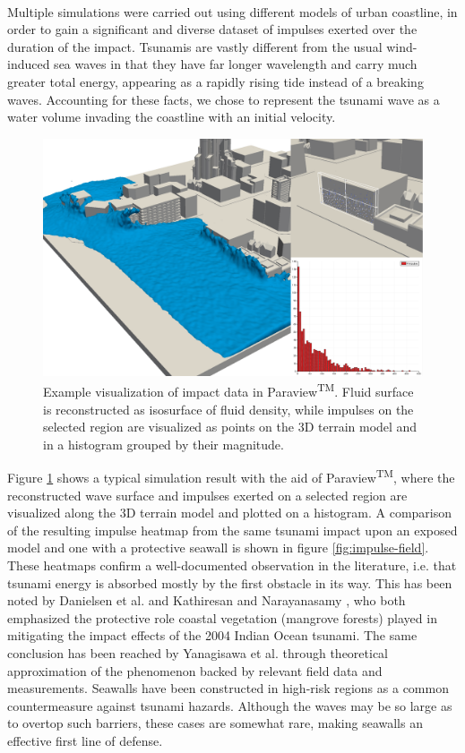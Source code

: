 \documentclass{llncs}
\begin{document}
\paragraph{} Multiple simulations were carried out using different models of urban
coastline, in order to gain a significant and diverse dataset of impulses exerted over the
duration of the impact. Tsunamis are vastly different from the usual wind-induced sea
waves in that they have far longer wavelength and carry much greater total energy,
appearing as a rapidly rising tide instead of a breaking waves. Accounting for these
facts, we chose to represent the tsunami wave as a water volume invading the coastline
with an initial velocity.

\begin{figure}[h!]
  \includegraphics[width=\textwidth]{figures/paraview.png}
  \caption{Example visualization of impact data in Paraview\textsuperscript{TM}. Fluid
    surface is reconstructed as isosurface of fluid density, while impulses on the
    selected region are visualized as points on the 3D terrain model and in a histogram
    grouped by their magnitude.}
  \label{fig:visualization}
\end{figure}

Figure \ref{fig:visualization} shows a typical simulation result with the aid of
Paraview\textsuperscript{TM}, where the reconstructed wave surface and impulses exerted on
a selected region are visualized along the 3D terrain model and plotted on a histogram. A
comparison of the resulting impulse heatmap from the same tsunami impact upon an exposed
model and one with a protective seawall is shown in figure \ref{fig:impulse-field}. These
heatmaps confirm a well-documented observation in the literature, i.e. that tsunami energy
is absorbed mostly by the first obstacle in its way. This has been noted by Danielsen et
al. \cite{danielsen2005asian} and Kathiresan and Narayanasamy \cite{kathiresan2005601},
who both emphasized the protective role coastal vegetation (mangrove forests) played in
mitigating the impact effects of the 2004 Indian Ocean tsunami. The same conclusion has
been reached by Yanagisawa et al. \cite{yanagisawa200927} through theoretical
approximation of the phenomenon backed by relevant field data and measurements. Seawalls
have been constructed in high-risk regions as a common countermeasure against tsunami
hazards. Although the waves may be so large as to overtop such barriers, these cases are
somewhat rare, making seawalls an effective first line of defense.
\end{document}

